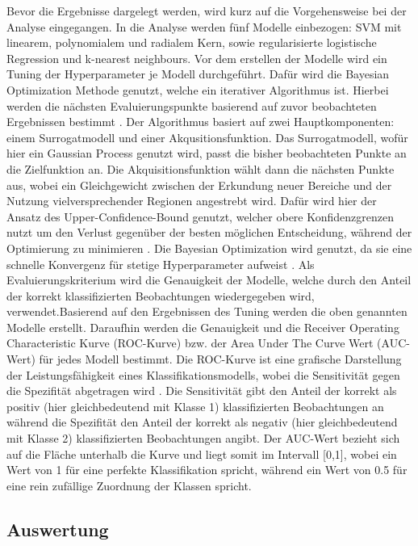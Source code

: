 \documentclass[
]{article}
\begin{document}
Bevor die Ergebnisse dargelegt werden, wird kurz auf die Vorgehensweise
bei der Analyse eingegangen. In die Analyse werden fünf Modelle
einbezogen: SVM mit linearem, polynomialem und radialem Kern, sowie
regularisierte logistische Regression und k-nearest neighbours.\newline
Vor dem erstellen der Modelle wird ein Tuning der Hyperparameter je
Modell durchgeführt. Dafür wird die Bayesian Optimization Methode
genutzt, welche ein iterativer Algorithmus ist. Hierbei werden die
nächsten Evaluierungspunkte basierend auf zuvor beobachteten Ergebnissen
bestimmt \parencite{yangHyperparameterOptimizationMachine2020}. Der
Algorithmus basiert auf zwei Hauptkomponenten: einem Surrogatmodell und
einer Akqusitionsfunktion. Das Surrogatmodell, wofür hier ein Gaussian
Process genutzt wird, passt die bisher beobachteten Punkte an die
Zielfunktion an. Die Akquisitionsfunktion wählt dann die nächsten Punkte
aus, wobei ein Gleichgewicht zwischen der Erkundung neuer Bereiche und
der Nutzung vielversprechender Regionen angestrebt wird. Dafür wird hier
der Ansatz des Upper-Confidence-Bound genutzt, welcher obere
Konfidenzgrenzen nutzt um den Verlust gegenüber der besten möglichen
Entscheidung, während der Optimierung zu minimieren
\parencite{snoekPracticalBayesianOptimization2012}. Die Bayesian
Optimization wird genutzt, da sie eine schnelle Konvergenz für stetige
Hyperparameter aufweist
\parencite{yangHyperparameterOptimizationMachine2020}. Als
Evaluierungskriterium wird die Genauigkeit der Modelle, welche durch den
Anteil der korrekt klassifizierten Beobachtungen wiedergegeben wird,
verwendet.\newline Basierend auf den Ergebnissen des Tuning werden die
oben genannten Modelle erstellt. Daraufhin werden die Genauigkeit und
die Receiver Operating Characteristic Kurve (ROC-Kurve) bzw. der Area
Under The Curve Wert (AUC-Wert) für jedes Modell bestimmt. Die ROC-Kurve
ist eine grafische Darstellung der Leistungsfähigkeit eines
Klassifikationsmodells, wobei die Sensitivität gegen die Spezifität
abgetragen wird \parencite{fawcettIntroductionROCAnalysis2006}. Die
Sensitivität gibt den Anteil der korrekt als positiv (hier
gleichbedeutend mit Klasse 1) klassifizierten Beobachtungen an während
die Spezifität den Anteil der korrekt als negativ (hier gleichbedeutend
mit Klasse 2) klassifizierten Beobachtungen angibt. Der AUC-Wert bezieht
sich auf die Fläche unterhalb die Kurve und liegt somit im Intervall
{[}0,1{]}, wobei ein Wert von 1 für eine perfekte Klassifikation
spricht, während ein Wert von 0.5 für eine rein zufällige Zuordnung der
Klassen spricht.

\subsection{Auswertung}

\newpage
{}

\printbibliography
\end{document}
